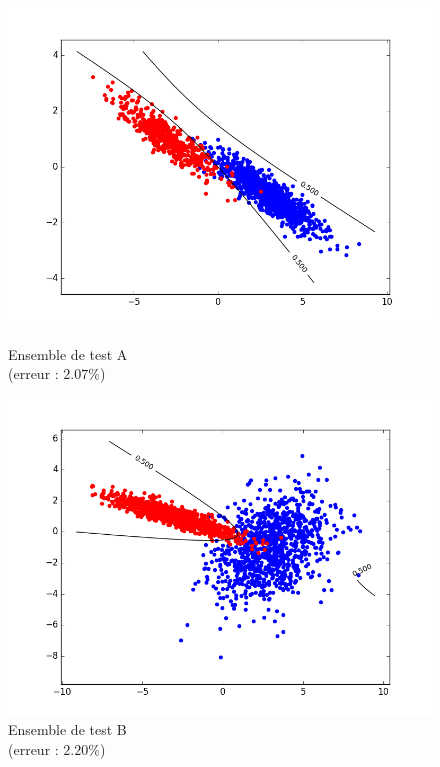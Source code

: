 \documentclass[paper=a4, fontsize=11pt]{article}
\begin{document}
\begin{figure}[h]
 \begin{minipage}[b]{.3\linewidth}
 \begin{center}
 \includegraphics[scale=0.25]{figures/QDA_A_test.png}
  \caption*{Ensemble de test A \\ (erreur : $2.07\%$)}
 \end{center}
 \end{minipage} \hfill
 \begin{minipage}[b]{.3\linewidth}
  \includegraphics[scale=0.25]{figures/QDA_B_test.png}
  \caption*{Ensemble de test B \\ (erreur : $2.20\%$)}
 \end{minipage} \hfill

\end{figure}
\end{document}
